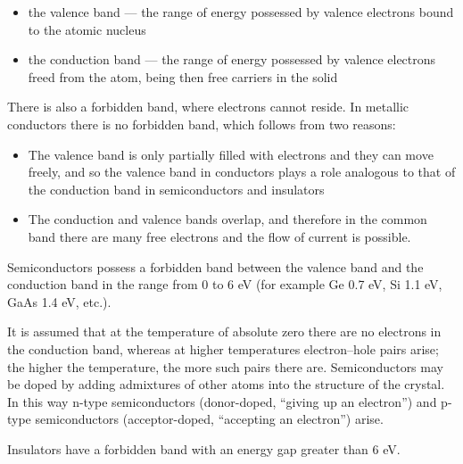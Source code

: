 \begin{itemize}
    \item the valence band --- the range of energy possessed by valence electrons bound to the atomic nucleus
    \item the conduction band --- the range of energy possessed by valence electrons freed from the atom, being then free carriers in the solid
\end{itemize}

There is also a forbidden band, where electrons cannot reside. In metallic conductors there is no forbidden band, which follows from two reasons:

\begin{itemize}
    \item The valence band is only partially filled with electrons and they can move freely, and so the valence band in conductors plays a role analogous to that of the conduction band in semiconductors and insulators
    \item The conduction and valence bands overlap, and therefore in the common band there are many free electrons and the flow of current is possible.
\end{itemize}

Semiconductors possess a forbidden band between the valence band and the conduction band in the range from 0 to 6 eV\merr{} (for example Ge 0.7 eV, Si 1.1 eV, GaAs 1.4 eV, etc.).

It is assumed that at the temperature of absolute zero there are no electrons in the conduction band, whereas at higher temperatures electron--hole pairs arise; the higher the temperature, the more such pairs there are. Semiconductors may be doped by adding admixtures of other atoms into the structure of the crystal. In this way n-type semiconductors (donor-doped, ``giving up an electron'') and p-type semiconductors (acceptor-doped, ``accepting an electron'') arise.

Insulators have a forbidden band with an energy gap greater than 6 eV.\merr